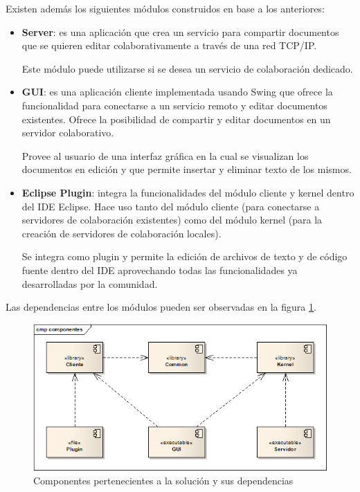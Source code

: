 \documentclass[12pt,a4paper]{article}
\begin{document}
Existen además los siguientes módulos construidos en base a los anteriores:
\begin{itemize}
	\item \textbf{Server}: es una aplicación que crea un servicio para compartir documentos que se quieren
	editar colaborativamente a través de una red TCP/IP.
	
	Este módulo puede utilizarse si se desea un servicio de colaboración dedicado.
	
	\item \textbf{GUI}: es una aplicación cliente implementada usando Swing que ofrece la funcionalidad
	para conectarse a un servicio remoto y editar documentos existentes. Ofrece la posibilidad de compartir
	y editar documentos	en un servidor colaborativo.
	
	Provee al usuario de una interfaz gráfica en la cual se visualizan los documentos en edición y
	que permite insertar y eliminar texto de los mismos.
	
	\item \textbf{Eclipse Plugin}: integra la funcionalidades del módulo cliente y kernel dentro del IDE Eclipse.
	Hace uso tanto del módulo cliente (para conectarse a servidores de colaboración existentes) como del módulo
	kernel (para la creación de servidores de colaboración locales).
	
	Se integra como plugin y permite la edición de archivos de texto y de código fuente	dentro del IDE aprovechando
	todas las funcionalidades ya desarrolladas por la comunidad.
\end{itemize}

Las dependencias entre los módulos pueden ser observadas en la figura \ref{componentes}.

	\begin{figure}[!ht]
		\begin{center}
			\includegraphics[width=13cm]{componentes.png}
			\caption{\label{componentes} Componentes pertenecientes a la solución y sus dependencias }
		\end{center}
	\end{figure}
\end{document}
